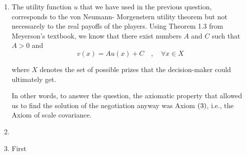 \begin{enumerate} [label=\alph*.]
    \vspace{5mm}
    
    Now let us find the optimal strategy. We look for parameters $\alpha$, $\beta$ and $\gamma$ with
    \begin{align*}
        & p \parent{\squared{\text{boxing}}} = \alpha \\
        & p \parent{\squared{\text{ballet}}} = \beta \\
        & p \parent{\squared{\text{home}}} = \gamma
    \end{align*}
    
    We know that $\alpha, \beta, \gamma \geq 0$, and $\alpha + \beta + \gamma = 1$. Also, since the NBS is on the line between $\parent{0.25,1}$ and $\parent{1,0}$, we know that $\gamma = 0$, hence $\alpha + \beta = 1$ and we can write $\beta = 1 - \alpha$. 
    
    
    We know that 
    \begin{align*}
        & u_{A} \parent{\alpha \squared{\text{boxing}} + \parent{1 - \alpha} \squared{\text{ballet}}} = \dfrac{1}{2} \\
        & u_{B} \parent{\alpha \squared{\text{boxing}} + \parent{1 - \alpha} \squared{\text{ballet}}} = \dfrac{2}{3}
    \end{align*}
    
    
    We know that we only need one of these two equations to find $\alpha$. Let us take the second equation. Using the linearity of the utility function, we have
    \begin{equation*}
        \alpha \cdot u_{B} \parent{\squared{\text{boxing}}} + \parent{1 - \alpha} \cdot u_{B} \parent{ \squared{\text{ballet}}}
        = \alpha \cdot 1 + \parent{1 - \alpha} \cdot 0
        = \dfrac{2}{3}
    \end{equation*}
    
    Hence we find $\alpha = \dfrac{2}{3}$ and $\beta = \dfrac{1}{3}$.
	
	
	\item The utility function $u$ that we have used in the previous question, corresponds to the von Neumann- Morgenstern utility theorem but not necessarely to the real payoffs of the players. Using Theorem 1.3 from Meyerson's textbook, we know that there exist numbers $A$ and $C$ such that $A > 0$ and
	\begin{equation*}
	    v (x) = A u(x) + C \quad , \quad \forall x \in X
	\end{equation*}
	
	where $X$ denotes the set of possible prizes that the decision-maker could ultimately get.
 
	
	
	In other words, to answer the question, the axiomatic property that allowed us to find the solution of the negotiation anyway was Axiom $\left(3\right)$, i.e., the Axiom of scale covariance. 
	
	\item 
	
	\item First
	
\end{enumerate}
	
	
